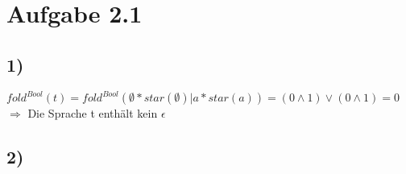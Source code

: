 \section*{Aufgabe 2.1}
\subsection*{1)}
$fold^{Bool}(t) =
fold^{Bool}(\emptyset * star(\emptyset) | a * star(a)) = 
(0 \wedge 1) \vee (0 \wedge 1) = 0$ \\
$\Longrightarrow$ Die Sprache t enthält kein $\epsilon$
\subsection*{2)}